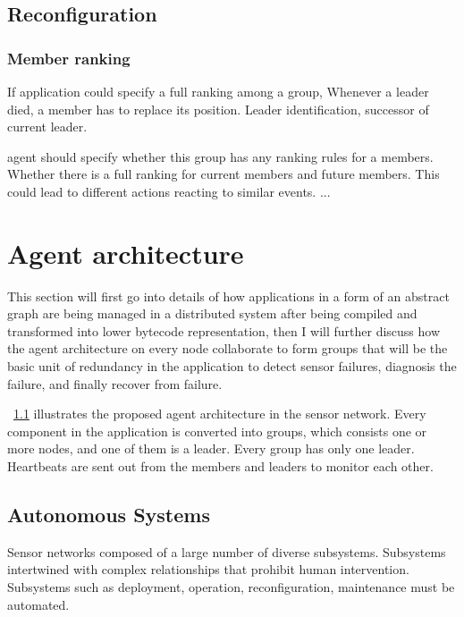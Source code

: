 \subsection{Reconfiguration}

\subsubsection{Member ranking}

If application could specify a full ranking among a group, 
Whenever a leader died, a member has to replace its position.
Leader identification, successor of current leader.

 agent should specify whether this group has any ranking rules for a members. Whether there is a full ranking for current members and future members. This could lead to different actions reacting to similar events. ...



\section{Agent architecture}

This section will first go into details of how applications in a form of an
abstract graph are being managed in a distributed system after being compiled 
and transformed into lower bytecode representation, then I will further discuss 
how the agent architecture on every node collaborate to form groups that will 
be the basic unit of redundancy in the application to detect sensor failures, 
diagnosis the failure, and finally recover from failure.

~\ref{} illustrates the proposed agent architecture in the sensor network.
Every component in the application is converted into groups, which consists one
or more nodes, and one of them is a leader. Every group has only one leader.
Heartbeats are sent out from the members and leaders to monitor each other.

\subsection{Autonomous Systems}

Sensor networks composed of a large number of diverse subsystems. Subsystems
intertwined with complex relationships that prohibit human intervention.
Subsystems such as deployment, operation, reconfiguration, maintenance must be
automated.

